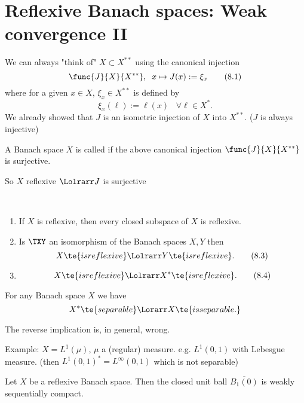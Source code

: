 \section{Reflexive Banach spaces: Weak convergence II}

We can always "think of" $X\subset X^{**}$ using the canonical injection
\[\func{J}{X}{X^{**}},\;\;x\mapsto J(x):=\xi_x\tag{8.1}\label{8.1}\]
where for a given $x\in X$, $\xi_x\in X^{**}$ is defined by
\[\xi_x(\ell):=\ell(x)\;\;\;\forall\ell\in X^*.\tag{8.2}\label{8.2}\]
We already showed that $J$ is an isometric injection of $X$ into $X^{**}$. ($J$ is always injective)

\begin{definition}\label{viii.1}
    A Banach space $X$ is called  if the above canonical injection $\func{J}{X}{X^{**}}$ is surjective.
    
    \rec{(}So $X$ reflexive $\Lolrarr J$ is surjective\rec{)}
\end{definition}

\begin{lem}\label{viii.2}\ 
    \begin{enumerate}[label=\alph*)]
        \item \label{viii.2.a}If $X$ is reflexive, then every closed subspace of $X$ is reflexive.
        \item \label{viii.2.b}Is $\TXY$ an isomorphism of the Banach spaces $X,Y$ then
        \[X\te{ is reflexive }\Lolrarr Y\te{ is reflexive}.\tag{8.3}\label{8.3}\]
        \item \label{viii.2.c}
        \[X\te{ is reflexive }\Lolrarr X^*\te{ is reflexive}.\tag{8.4}\label{8.4}\]
    \end{enumerate}
\end{lem}

\begin{lem}\label{viii.3}
    For any Banach space $X$ we have
    \[X^*\te{ separable }\Lorarr X\te{ is separable.}\]
\end{lem}

 The reverse implication is, in general, wrong.

Example: $X=L^1(\mu)$, $\mu$ a (regular) measure. e.g. $L^1(0,1)$ with Lebesgue measure. (then $L^1(0,1)^*=L^\infty(0,1)$ which is not separable)

\begin{thm}\label{viii.4}
    Let $X$ be a reflexive Banach space. Then the closed unit ball $\overline{B_1(0)}$ is weakly sequentially compact.
\end{thm}


